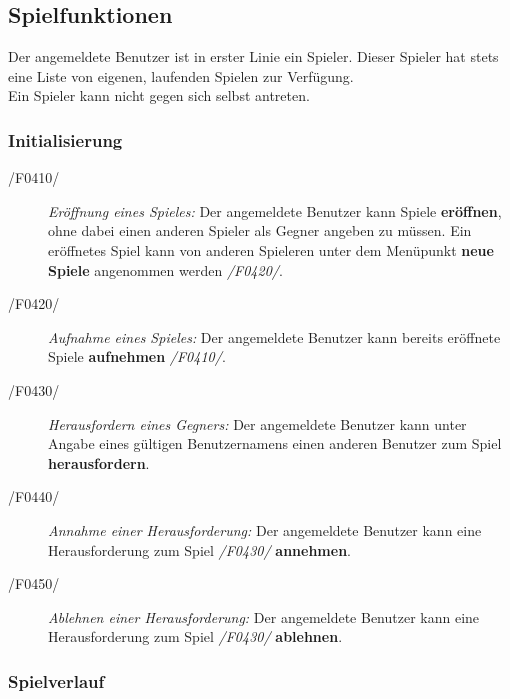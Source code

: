 \subsection{Spielfunktionen}

Der angemeldete Benutzer ist in erster Linie ein Spieler.
Dieser Spieler hat stets eine Liste von eigenen, laufenden Spielen zur Verfügung.\\
Ein Spieler kann nicht gegen sich selbst antreten.

\subsubsection{Initialisierung}

\begin{description}
  \item[/F0410/]
    \textit{Eröffnung eines Spieles:}
    Der angemeldete Benutzer kann Spiele \textbf{eröffnen}, ohne dabei einen anderen Spieler als Gegner angeben zu müssen.
    Ein eröffnetes Spiel kann von anderen Spieleren unter dem Menüpunkt \textbf{neue Spiele} angenommen werden \textit{/F0420/}.
  \item[/F0420/]
    \textit{Aufnahme eines Spieles:}
    Der angemeldete Benutzer kann bereits eröffnete Spiele \textbf{aufnehmen} \textit{/F0410/}.
  \item[/F0430/]
    \textit{Herausfordern eines Gegners:}
    Der angemeldete Benutzer kann unter Angabe eines gültigen Benutzernamens einen anderen Benutzer zum Spiel \textbf{herausfordern}.
  \item[/F0440/]
    \textit{Annahme einer Herausforderung:}
    Der angemeldete Benutzer kann eine Herausforderung zum Spiel \textit{/F0430/} \textbf{annehmen}.
  \item[/F0450/]
    \textit{Ablehnen einer Herausforderung:}
    Der angemeldete Benutzer kann eine Herausforderung zum Spiel \textit{/F0430/} \textbf{ablehnen}.
\end{description}

\subsubsection{Spielverlauf}

